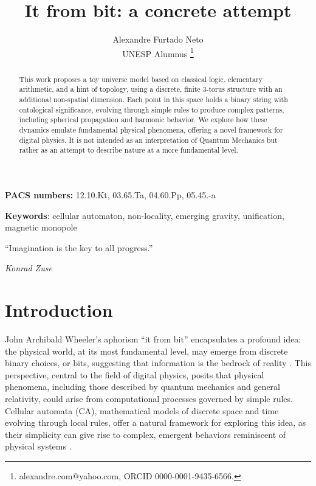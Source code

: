 \documentclass[12pt]{article}
\begin{document}
\title{It from bit: a concrete attempt}
\author{Alexandre Furtado Neto \\ UNESP Alumnus \thanks{alexandre.com@yahoo.com, ORCID 0000-0001-9435-6566.}}
\maketitle

\begin{abstract}
This work proposes a toy universe model based on classical logic, elementary arithmetic, and a hint of topology, using a discrete, finite 3-torus structure with an additional non-spatial dimension. Each point in this space holds a binary string with ontological significance, evolving through simple rules to produce complex patterns, including spherical propagation and harmonic behavior. We explore how these dynamics emulate fundamental physical phenomena, offering a novel framework for digital physics.  It is not intended as an interpretation of Quantum Mechanics but rather as an attempt to describe nature at a more fundamental level.

\medskip{}
\end{abstract}

\vfill

\begin{center}
\textbf{PACS numbers: }12.10.Kt, 03.65.Ta, 04.60.Pp, 05.45.-a
\par\end{center}

\begin{center}
\textbf{Keywords}: cellular automaton, non-locality, emerging gravity, unification, magnetic monopole
\par\end{center}

\newpage


\epigraph{``Imagination is the key to all progress.''}{\textit{Konrad Zuse}}

\section{Introduction}

John Archibald Wheeler's aphorism ``it from bit'' encapsulates a profound idea: the physical world, at its most fundamental level, may emerge from discrete binary choices, or bits, suggesting that information is the bedrock of reality \cite{wheeler}. This perspective, central to the field of digital physics, posits that physical phenomena, including those described by quantum mechanics and general relativity, could arise from computational processes governed by simple rules. Cellular automata (CA), mathematical models of discrete space and time evolving through local rules, offer a natural framework for exploring this idea, as their simplicity can give rise to complex, emergent behaviors reminiscent of physical systems \cite{wolfram,zuse,fredkin}.
\end{document}

